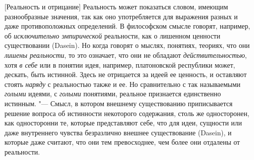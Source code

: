 %
  {[Реальность и отрицание]}
\label{bkm:bm73a}
Реальность может показаться словом, имеющим разнообразные значения, так как
оно употребляется для выражения разных и даже противоположных определений.
В философском смысле говорят, например, об
{\em исключительно эмпирической} реальности, как о
лишенном ценности существовании (Dasein). Но когда говорят о мыслях,
понятиях, теориях, что они {\em лишены реальности}, то
это означает, что они не обладают {\em действительностью}, хотя
{\em в себе} или в понятии идея, например, платоновской
республики может, дескать, быть истинной. Здесь не отрицается за идеей ее
ценность, и оставляют стоять {\em наряду} с реальностью
также и ее. Но сравнительно с так называемыми
{\em голыми} идеями, с {\em голыми}
понятиями, реальное признается единственно истинным. "--- Смысл, в котором
внешнему существованию приписывается решение вопроса об истинности
некоторого содержания, столь же односторонен, как односторонни те, которые
представляют себе, что для идеи, сущности или даже внутреннего чувства
безразлично внешнее существование (Dasein), и которые даже считают, что они
тем превосходнее, чем более они отдалены от реальности.

